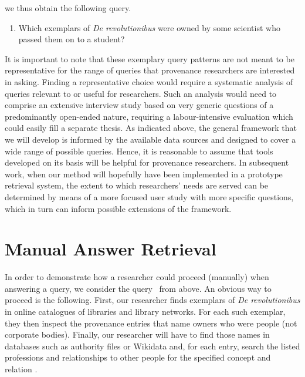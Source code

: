 we thus obtain the following query.
%
\begin{enumerate}
  \item[\exaquery{2$'$}]
    Which exemplars of \emph{De revolutionibus} were owned by some scientist who passed them on to a student?
\end{enumerate}
%
It is important to note that these exemplary query patterns are not meant to be representative
for the range of queries that provenance researchers are interested in asking.
Finding a representative choice would require a systematic analysis
of queries relevant to or useful for researchers.
Such an analysis would need to comprise an extensive interview study
based on very generic questions of a predominantly open-ended nature,
requiring a labour-intensive evaluation which could easily fill a separate thesis.
As indicated above, the general framework that we will develop
is informed by the available data sources
and designed to cover a wide range of possible queries.
Hence,
it is reasonable to assume that tools developed on its basis will be helpful for provenance researchers.
In subsequent work, when our method will hopefully have been implemented in a prototype retrieval system,
the extent to which researchers' needs are served can be determined by means of a more focused user study
with more specific questions, which in turn can inform possible extensions of the framework.

\section{Manual Answer Retrieval}
\label{sec:manual_answering}

In order to demonstrate how a researcher could proceed (manually) when answering a query,
we consider the query~ from above.
An obvious way to proceed is the following.
First, our researcher finds exemplars of \emph{De revolutionibus} 
in online catalogues of libraries and library networks. For each such exemplar, they then inspect the provenance entries
that name owners who were people (not corporate bodies). Finally, our researcher will have to find those names in databases such as
authority files or Wikidata and, for each entry, search the listed professions 
and relationships to other people for the specified concept  and relation .

